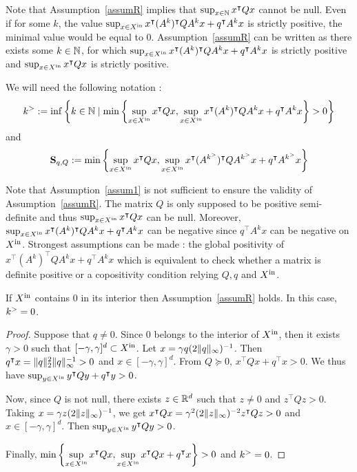 \documentclass[10pt]{article}
\begin{document}
Note that Assumption~\ref{assumR} implies that $\sup_{x\in\mathbb{N}} x^\intercal Q x$ cannot be null. Even if for some $k$, the value
$\sup_{x\in X^\mathrm{in}} x^\intercal (A^k)^\intercal Q A^k x+q^\intercal A^k x$ is strictly positive, the minimal value would be equal to 0. 
Assumption~\ref{assumR} can be written as there exists  some $k\in\mathbb{N}$, for which $\sup_{x\in X^\mathrm{in}} x^\intercal (A^k)^\intercal Q A^k x+q^\intercal A^k x$ is strictly positive and $\sup_{x\in X^\mathrm{in}} x^\intercal Q x$ is strictly positive.
 
We will need the following notation :
\[
k^{>}:=\inf\left\{k\in\mathbb{N}\mid \min\left\{\sup_{x\in X^\mathrm{in}} x^\intercal Q x , \sup_{x\in X^\mathrm{in}} x^\intercal (A^k)^\intercal Q A^k x+q^\intercal A^k x\right\}>0\right\}
\]
and
\[
\mathbf{S}_{q,Q}:= \min\left\{\sup_{x\in X^\mathrm{in}} x^\intercal Q x , \sup_{x\in X^\mathrm{in}} x^\intercal (A^{k^{>}})^\intercal Q A^{k^{>}} x+q^\intercal A^{k^{>}}x\right\}
\]

Note that Assumption~\ref{assum1} is not sufficient to ensure the validity of Assumption~\ref{assumR}. The matrix $Q$ is only supposed to be positive semi-definite and thus $\sup_{x\in X^\mathrm{in}} x^\intercal Q x$ can be null. Moreover, $\sup_{x\in X^\mathrm{in}} x^\intercal (A^k)^\intercal Q A^k x+q^\intercal A^k x$ can be negative since $q^\intercal A^k x$ can be negative on $X^\mathrm{in}$. Strongest assumptions can be made : the global positivity of $x^\intercal (A^k)^\intercal  Q A^k x+q^\intercal A^k x$ which is equivalent to check whether a matrix is definite positive or a copositivity condition relying $Q,q$ and $X^\mathrm{in}$. 

\begin{prop}
\label{interiorprop}
If $X^\mathrm{in}$ contains $0$ in its interior then Assumption~\ref{assumR} holds. In this case, $k^{>}=0$.
\end{prop}

\begin{proof}
Suppose that $q\neq 0$. Since 0 belongs to the interior of $X^\mathrm{in}$, then it exists $\gamma>0$ such that $[-\gamma,\gamma]^d\subset X^\mathrm{in}$. Let $x=\gamma q (2\| q\|_{\infty})^{-1}$. Then $q^\intercal x=\| q\|_2^2\| q\|_{\infty}^{-1} >0$ and $x\in [-\gamma,\gamma]^d$. From $Q\succeq 0$, $x^\intercal Q x+q^\intercal x>0$. We thus have $\sup_{y\in X^\mathrm{in}}  y^\intercal Q y+q^\intercal y>0$. 

Now, since $Q$ is not null, there exists $z\in\mathbb R^d$ such that $z\neq 0$ and $z^\intercal Q z>0$. Taking $x=\gamma z (2\| z\|_\infty)^{-1}$, we get $x^\intercal Q x=\gamma ^2 (2\| z\|_\infty)^{-2} z^\intercal Q z>0$ and $x\in[-\gamma,\gamma]^d$. Then $\sup_{y\in X^\mathrm{in}} y^\intercal Q y>0$. 

Finally, $\displaystyle{\min\left\{\sup_{x\in X^\mathrm{in}} x^\intercal Q x , \sup_{x\in X^\mathrm{in}} x^\intercal Q x+q^\intercal x\right\}>0}$ and $k^{>}=0$.
\end{proof}
\end{document}
